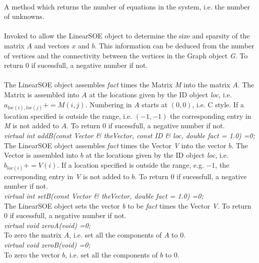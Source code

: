  \\
A method which returns the number of equations in the system, i.e. the number
of unknowns. \\  

 \\
Invoked to allow the LinearSOE object to determine the size and sparsity of 
the matrix $A$ and vectors $x$ and $b$. This information can be
deduced from the number of vertices and the connectivity between the
vertices in the Graph object {\em G}. To return $0$ if
sucessfull, a negative number if not. \\  

 \\
The LinearSOE object assembles {\em fact} times the Matrix {\em
M} into the matrix $A$. The Matrix is assembled into $A$ at the
locations given by the ID object {\em loc}, i.e. $a_{loc(i),loc(j)} +=
M(i,j)$. Numbering in $A$ starts at $(0,0)$, i.e. C style. If a
location specified is outside the range, i.e. $(-1,-1)$ the
corresponding entry in {\em M} is not added to $A$. To return $0$ if
sucessfull, a negative number if not. \\ 

{\em virtual int addB(const Vector \& theVector, const ID \& loc,
double fact = 1.0) =0;} \\
The LinearSOE object assembles {\em fact} times the Vector {\em V} into
the vector $b$. The Vector is assembled into $b$ at the locations
given by the ID object {\em loc}, i.e. $b_{loc(i)} += V(i)$. If a
location specified is outside the range, e.g. $-1$, the corresponding
entry in {\em V} is not added to $b$. To return $0$ if sucessfull, a
negative number if not.  \\ 

{\em virtual int setB(const Vector \& theVector,
double fact = 1.0) =0;} \\
The LinearSOE object sets the vector {\em b} to be {\em fact} times
the Vector {\em V}. To return $0$ if sucessfull, a negative number if
not.  \\  

{\em virtual void zeroA(void) =0;} \\
To zero the matrix $A$, i.e. set all the components of $A$ to $0$. \\

{\em virtual void zeroB(void) =0;} \\
To zero the vector $b$, i.e. set all the components of $b$ to $0$. \\

